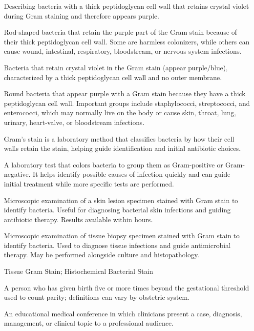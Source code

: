  Describing bacteria with a thick peptidoglycan cell wall that retains crystal violet during Gram staining and therefore appears purple.

 Rod-shaped bacteria that retain the purple part of the Gram stain because of their thick peptidoglycan cell wall. Some are harmless colonizers, while others can cause wound, intestinal, respiratory, bloodstream, or nervous-system infections.

 Bacteria that retain crystal violet in the Gram stain (appear purple/blue),
characterized by a thick peptidoglycan cell wall and no outer membrane.

 Round bacteria that appear purple with a Gram stain because they have a thick peptidoglycan cell wall. Important groups include staphylococci, streptococci, and enterococci, which may normally live on the body or cause skin, throat, lung, urinary, heart-valve, or bloodstream infections.

 Gram's stain is a laboratory method that classifies bacteria by how their cell walls retain the stain, helping guide identification and initial antibiotic choices.

 A laboratory test that colors bacteria to group them as Gram-positive or Gram-negative. It helps identify possible causes of infection quickly and can guide initial treatment while more specific tests are performed.

 Microscopic examination of a skin lesion specimen stained with Gram stain to identify bacteria. Useful for diagnosing bacterial skin infections and guiding antibiotic therapy. Results available within hours.

 Microscopic examination of tissue biopsy specimen stained with Gram stain to identify bacteria. Used to diagnose tissue infections and guide antimicrobial therapy. May be performed alongside culture and histopathology.

\synonyms
Tissue Gram Stain; Histochemical Bacterial Stain

 A person who has given birth five or more times beyond the gestational threshold used to count parity; definitions can vary by obstetric system.

 An educational medical conference in which clinicians present a case, diagnosis, management, or clinical topic to a professional audience.

